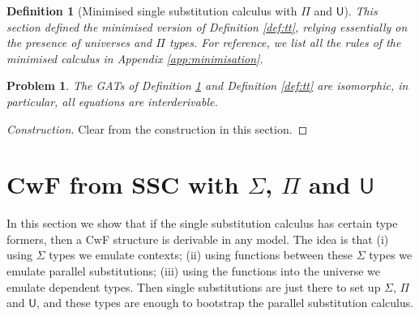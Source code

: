 \documentclass[submission,copyright,creativecommons]{eptcs}
\newtheorem{problem}[theorem]{Problem}
\newtheorem{definition}[theorem]{Definition}
\newcommand{\U}{\mathsf{U}}
\begin{document}
\begin{definition}[Minimised single substitution calculus with $\Pi$ and $\U$]\label{def:min}
  This section defined the minimised version of Definition
  \ref{def:tt}, relying essentially on the presence of universes and
  $\Pi$ types. For reference, we list all the rules of the minimised
  calculus in Appendix \ref{app:minimisation}.
\end{definition}
\begin{problem}
  The GATs of Definition \ref{def:min} and Definition \ref{def:tt} are
  isomorphic, in particular, all equations are interderivable.
\end{problem}
\begin{proof}[Construction]
  Clear from the construction in this section.
\end{proof}

\section{\texorpdfstring{CwF from SSC with $\Sigma$, $\Pi$ and $\U$}{CwF from SSC with Σ, Π and U}}
\label{sec:cwf}

In this section we show that if the single substitution calculus has
certain type formers, then a CwF structure is derivable in any model.
The idea is that (i) using $\Sigma$ types we emulate contexts; (ii)
using functions between these $\Sigma$ types we emulate parallel
substitutions; (iii) using the functions into the universe we emulate
dependent types. Then single substitutions are just there to set up
$\Sigma$, $\Pi$ and $\U$, and these types are enough to bootstrap the
parallel substitution calculus.
\end{document}
